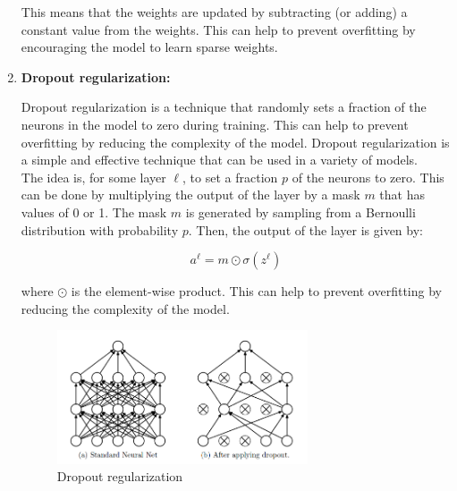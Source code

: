\begin{enumerate}
    This means that the weights are updated by subtracting (or adding) a constant value from
    the weights. This can help to prevent overfitting by encouraging the model to learn
    sparse weights.\\


    \item \textbf{Dropout regularization:}
    
    Dropout regularization is a technique that randomly sets a fraction of the
    neurons in the model to zero during training. This can help to prevent
    overfitting by reducing the complexity of the model. Dropout regularization
    is a simple and effective technique that can be used in a variety of models.\\

    The idea is, for some layer $\ell$, to set a fraction $p$ of the neurons to zero.
    This can be done by multiplying the output of the layer by a mask $m$ that has
    values of 0 or 1. The mask $m$ is generated by sampling from a Bernoulli distribution
    with probability $p$. Then, the output of the layer is given by:

    $$a^\ell = m \odot \sigma(z^\ell)$$

    where $\odot$ is the element-wise product. This can help to prevent overfitting
    by reducing the complexity of the model.

    \begin{figure}[H]
        \centering
        \includegraphics[width=0.7\textwidth]{figures/dropout.png}
        \caption{Dropout regularization}
        \label{fig:dropout}
    \end{figure}

\end{enumerate}








